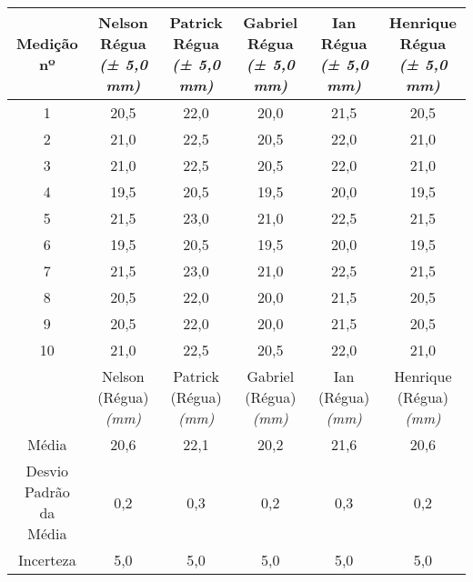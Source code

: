 \documentclass{article}
\begin{document}
\begin{table}[h!]
\centering
\begin{tabular}{c c c c c c }
\toprule
Medição nº & \shortstack{Nelson\\Régua\\\textit{(± 5,0 mm)}} & \shortstack{Patrick\\Régua\\\textit{(± 5,0 mm)}} & \shortstack{Gabriel\\Régua\\\textit{(± 5,0 mm)}} & \shortstack{Ian\\Régua\\\textit{(± 5,0 mm)}} & \shortstack{Henrique\\Régua\\\textit{(± 5,0 mm)}}\\
\midrule
1 & 20,5 & 22,0 & 20,0 & 21,5 & 20,5\\
2 & 21,0 & 22,5 & 20,5 & 22,0 & 21,0\\
3 & 21,0 & 22,5 & 20,5 & 22,0 & 21,0\\
4 & 19,5 & 20,5 & 19,5 & 20,0 & 19,5\\
5 & 21,5 & 23,0 & 21,0 & 22,5 & 21,5\\
6 & 19,5 & 20,5 & 19,5 & 20,0 & 19,5\\
7 & 21,5 & 23,0 & 21,0 & 22,5 & 21,5\\
8 & 20,5 & 22,0 & 20,0 & 21,5 & 20,5\\
9 & 20,5 & 22,0 & 20,0 & 21,5 & 20,5\\
10 & 21,0 & 22,5 & 20,5 & 22,0 & 21,0\\
\midrule
&\shortstack{Nelson\\(Régua)\\\textit{(mm)}} & \shortstack{Patrick\\(Régua)\\\textit{(mm)}} & \shortstack{Gabriel\\(Régua)\\\textit{(mm)}} & \shortstack{Ian\\(Régua)\\\textit{(mm)}} & \shortstack{Henrique\\(Régua)\\\textit{(mm)}}\\
\midrule
Média & 20,6 & 22,1 & 20,2 & 21,6 & 20,6\\[3pt]
\shortstack{Desvio\\Padrão da\\Média} & 0,2 & 0,3 & 0,2 & 0,3 & 0,2\\[3pt]
Incerteza & 5,0 & 5,0 & 5,0 & 5,0 & 5,0\\
\bottomrule
\end{tabular}
\end{table}
\end{document}
